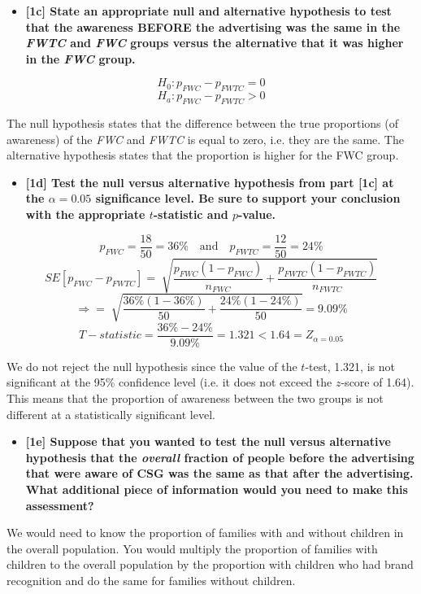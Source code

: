 \documentclass[10pt, oneside,spanish]{article}
\begin{document}
\pagebreak

\begin{itemize}
\item \textbf{[1c] State an appropriate null and alternative hypothesis to test that the awareness BEFORE the advertising was the same in the \textit{FWTC} and \textit{FWC} groups versus the alternative that it was higher in the \textit{FWC} group.}
\end{itemize}
$$ H_0 : p_{FWC} - p_{FWTC} =  0 $$
$$ H_a : p_{FWC} - p_{FWTC} >  0 $$

The null hypothesis states that the difference between the true proportions (of awareness) of the \textit{FWC} and \textit{FWTC} is equal to zero, i.e. they are the same. The alternative hypothesis states that the proportion is higher for the FWC group. 


\begin{itemize}
\item \textbf{[1d] Test the null versus alternative hypothesis from part [1c] at the $\alpha = 0.05$ significance level. Be sure to support your conclusion with the appropriate $t$-statistic and $p$-value.               }
\end{itemize}

$$ p_{FWC} = \frac{18}{50} = 36\%   \quad \textrm{and} \quad   p_{FWTC} =  \frac{12}{50} = 24\% $$
$$ SE[p_{FWC} - p_{FWTC}] = \sqrt[]{\frac{p_{FWC} (1 - p_{FWC})}{n_{FWC}} + \frac{p_{FWTC} (1 - p_{FWTC})}{n_{FWTC}}} $$
$$ \Rightarrow = \sqrt[]{\frac{ 36\%  (1 - 36\% )}{50} + \frac{ 24\%  (1 - 24\% )}{50} } = 9.09\% $$
$$T-statistic = \frac{36\% - 24\%}{9.09\%} = 1.321 < 1.64 = Z_{\alpha=0.05}  $$

We do not reject the null hypothesis since the value of the $t$-test, 1.321, is not significant at the 95\% confidence level (i.e. it does not exceed the $z$-score of 1.64). This means that the proportion of awareness between the two groups is not different at a statistically significant level. 

\begin{itemize}
\item \textbf{[1e] Suppose that you wanted to test the null versus alternative hypothesis that the \textit{overall} fraction of people before the advertising that were aware of CSG was the same as that after the advertising. What additional piece of information would you need to make this assessment?               }
\end{itemize}

We would need to know the proportion of families with and without children in the overall population.  You would multiply the proportion of families with children to the overall population by the proportion with children who had brand recognition and do the same for families without children.
\end{document}
